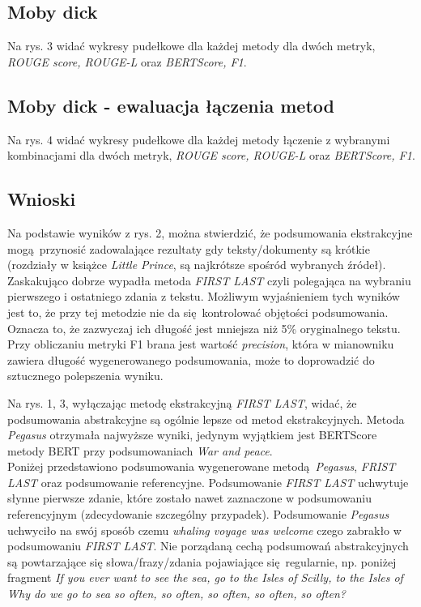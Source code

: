 \documentclass{article}
\begin{document}
\subsection{Moby dick}
Na rys. 3 widać wykresy pudełkowe dla każdej metody dla dwóch metryk, \textit{ROUGE score, ROUGE-L} oraz 
\textit{BERTScore, F1}.

\subsection{Moby dick - ewaluacja łączenia metod}
Na rys. 4 widać wykresy pudełkowe dla każdej metody łączenie z wybranymi kombinacjami dla dwóch metryk, 
\textit{ROUGE score, ROUGE-L} oraz \textit{BERTScore, F1}. 

\subsection{Wnioski}
Na podstawie wyników z rys. 2, można stwierdzić, że podsumowania ekstrakcyjne
mogą przynosić zadowalające rezultaty gdy teksty/dokumenty są krótkie (rozdziały w 
książce \textit{Little Prince}, są najkrótsze spośród wybranych źródeł). \\

Zaskakująco dobrze wypadła metoda \textit{FIRST LAST} czyli polegająca na wybraniu
pierwszego i ostatniego zdania z tekstu. Możliwym wyjaśnieniem tych wyników
jest to, że przy tej metodzie nie da się kontrolować objętości podsumowania. Oznacza
to, że zazwyczaj ich długość jest mniejsza niż 5\% oryginalnego tekstu. Przy obliczaniu
metryki F1 brana jest wartość \textit{precision}, która w mianowniku zawiera 
długość wygenerowanego podsumowania, może to doprowadzić do sztucznego polepszenia wyniku.

Na rys. 1, 3, wyłączając metodę ekstrakcyjną \textit{FIRST LAST}, widać, że podsumowania 
abstrakcyjne są ogólnie lepsze od metod ekstrakcyjnych.
Metoda \textit{Pegasus} otrzymała
najwyższe wyniki, jedynym wyjątkiem jest BERTScore metody BERT przy podsumowaniach 
\textit{War and peace}.\\

Poniżej przedstawiono podsumowania wygenerowane metodą \textit{Pegasus}, \textit{FRIST LAST} oraz
podsumowanie referencyjne. Podsumowanie \textit{FIRST LAST} uchwytuje słynne pierwsze zdanie,
które zostało nawet zaznaczone w podsumowaniu referencyjnym (zdecydowanie szczególny przypadek).
Podsumowanie \textit{Pegasus} uchwyciło na swój sposób czemu \textit{whaling voyage was welcome}
czego zabrakło w podsumowaniu \textit{FIRST LAST}. Nie porządaną cechą podsumowań abstrakcyjnych 
są powtarzające się słowa/frazy/zdania pojawiające się regularnie, np. poniżej fragment
\textit{If you ever want to see the sea, go to the Isles of Scilly, to the Isles of Why do we go
to sea so often, so often, so often, so often, so often?}
\end{document}
